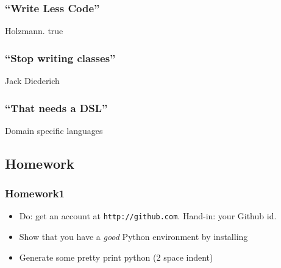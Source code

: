 \subsubsection{\texorpdfstring{``Write Less
Code''}{Write Less Code}}\label{write-less-code}

Holzmann. true

\subsubsection{\texorpdfstring{``Stop writing
classes''}{Stop writing classes}}\label{stop-writing-classes}

Jack Diederich

\subsubsection{\texorpdfstring{``That needs a
DSL''}{That needs a DSL}}\label{that-needs-a-dsl}

Domain specific languages

\subsection{Homework}\label{homework}

\subsubsection{Homework1}\label{homework1}

\begin{itemize}
\item
  Do: get an account at \texttt{http://github.com}. Hand-in: your Github
  id.
\item
  Show that you have a \emph{good} Python environment by installing
\item
  Generate some pretty print python (2 space indent)
\end{itemize}
